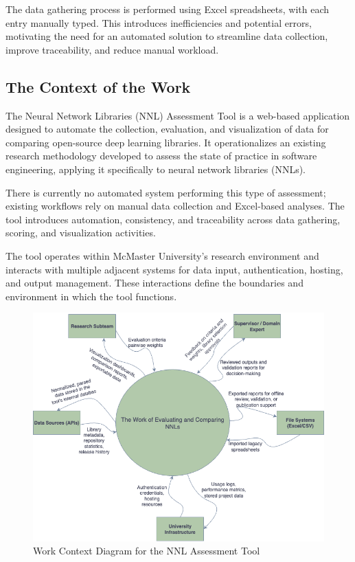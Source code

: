 \documentclass[12pt]{article}
\begin{document}
The data gathering process is performed using Excel spreadsheets, with each entry manually typed. This introduces inefficiencies and potential errors, motivating the need for an automated solution to streamline data collection, improve traceability, and reduce manual workload.

\subsection{The Context of the Work}
The Neural Network Libraries (NNL) Assessment Tool is a web-based application designed to automate the collection, evaluation, and visualization of data for comparing open-source deep learning libraries. It operationalizes an existing research methodology developed to assess the state of practice in software engineering, applying it specifically to neural network libraries (NNLs).

There is currently no automated system performing this type of assessment; existing workflows rely on manual data collection and Excel-based analyses. The tool introduces automation, consistency, and traceability across data gathering, scoring, and visualization activities.

The tool operates within McMaster University’s research environment and interacts with multiple adjacent systems for data input, authentication, hosting, and output management. These interactions define the boundaries and environment in which the tool functions.

\begin{figure}[H]
    \centering
    \includegraphics[width=\textwidth]{context-diagram.png}
    \caption{Work Context Diagram for the NNL Assessment Tool}
    \label{fig:context-diagram}
\end{figure}
\end{document}
